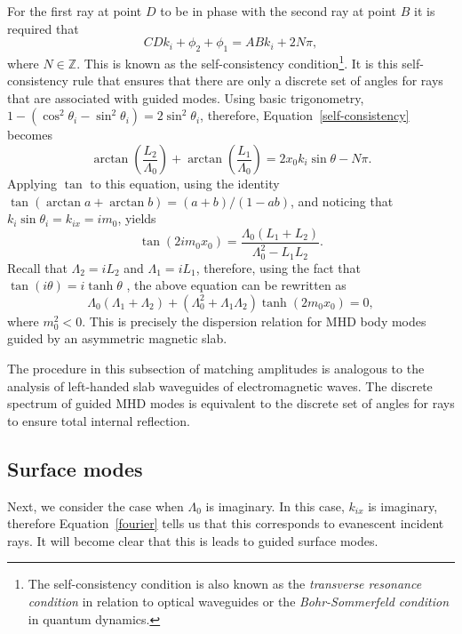 \documentclass[12pt]{../style-files/ociamthesis}
\begin{document}
	For the first ray at point $D$ to be in phase with the second ray at point $B$ it is required that
	\begin{equation}
	CD k_i  + \phi_2 + \phi_1 = AB k_i + 2N\pi, \label{self-consistency}
	\end{equation}
	where $N \in \mathbb{Z}$.
	This is known as the self-consistency condition\footnote{The self-consistency condition is also known as the \textit{transverse resonance condition} in relation to optical waveguides \citep{sym_etal92} or the \textit{Bohr-Sommerfeld condition} in quantum dynamics.}. It is this self-consistency rule that ensures that there are only a discrete set of angles for rays that are associated with guided modes. Using basic trigonometry, $1 - (\cos^2{\theta_i} - \sin^2{\theta_i}) = 2\sin^2{\theta_i}$, therefore, Equation~\eqref{self-consistency} becomes
	\begin{equation}
	\arctan\left(\frac{L_2}{\Lambda_0}\right) + \arctan\left(\frac{L_1}{\Lambda_0}\right) = 2x_0k_i \sin{\theta} - N\pi.
	\end{equation}
	Applying $\tan$ to this equation, using the identity $\tan(\arctan{a} + \arctan{b}) = (a + b) / (1 - ab)$, and noticing that $k_i\sin{\theta_i} = k_{ix} = im_0$, yields
	\begin{equation}
	\tan(2im_0x_0) = \frac{\Lambda_0 (L_1 + L_2)}{\Lambda_0^2 - L_1L_2}.
	\end{equation}
	Recall that $\Lambda_2 = iL_2$ and $\Lambda_1 = iL_1$, therefore, using the fact that $\tan(i\theta) = i\tanh{\theta}$ \citep{abr_etal65}, the above equation can be rewritten as
	\begin{equation}
	\Lambda_0 (\Lambda_1 + \Lambda_2) + (\Lambda_0^2 + \Lambda_1\Lambda_2)\tanh(2m_0x_0) = 0, \label{DR}
	\end{equation}
	where $m_0^2 < 0$. This is precisely the dispersion relation for MHD body modes guided by an asymmetric magnetic slab.
	
	The procedure in this subsection of matching amplitudes is analogous to the analysis of left-handed slab waveguides of electromagnetic waves. The discrete spectrum of guided MHD modes is equivalent to the discrete set of angles for rays to ensure total internal reflection.
	
	
	\subsection{Surface modes}
	Next, we consider the case when $\Lambda_0$ is imaginary. In this case, $k_{ix}$ is imaginary, therefore Equation~\eqref{fourier} tells us that this corresponds to evanescent incident rays. It will become clear that this is leads to guided surface modes.
	
\end{document}

